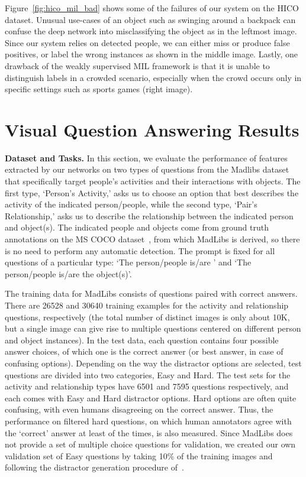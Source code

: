 \documentclass[runningheads]{llncs}
\begin{document}
Figure~\ref{fig:hico_mil_bad} shows some of the failures of our system on the HICO dataset. Unusual use-cases of an object such as swinging around a backpack can confuse the deep network into misclassifying the object as in the leftmost image. Since our system relies on detected people, we can either miss or produce false positives, or label the wrong instances as shown in the middle image. Lastly, one drawback of the weakly supervised MIL framework is that it is unable to distinguish labels in a crowded scenario, especially when the crowd occurs only in specific settings such as sports games (right image).

 


\section{Visual Question Answering Results}
\label{subsec:mcq}

{\bf Dataset and Tasks.} In this section, we evaluate the performance of features extracted by our networks on two types of questions from the Madlibs dataset~\cite{yu2015visual} that specifically target people's activities and their interactions with objects. The first type, `Person's Activity,' asks us to choose an option that best describes the activity of the indicated person/people, while the second type, `Pair's Relationship,' asks us to describe the relationship between the indicated person and object(s). The indicated people and objects come from ground truth annotations on the MS COCO dataset~\cite{lin2014microsoft}, from which MadLibs is derived, so there is no need to perform any automatic detection. The prompt is fixed for all questions of a particular type: `The person/people is/are \underline{}' and `The person/people is/are \underline{} the object(s)'. 

The training data for MadLibs consists of questions paired with correct answers. 
There are 26528 and 30640 training examples for the activity and relationship questions, respectively (the total number of distinct images is only about 10K, but a single image can give rise to multiple questions centered on different person and object instances). In the test data, each question contains four possible answer choices, of which one is the correct answer (or best answer, in case of confusing options). Depending on the way the distractor options are selected, test questions are divided into two categories, Easy and Hard. The test sets for the activity and relationship types have 6501 and 7595 questions respectively, and each comes with Easy and Hard distractor options. Hard options are often quite confusing, with even humans disagreeing on the correct answer. Thus, the performance on filtered hard questions, on which human annotators agree with the `correct' answer at least  of the times, is also measured. Since MadLibs does not provide a set of multiple choice questions for validation, we created our own validation set of Easy questions by taking 10\% of the training images and following the distractor generation procedure of~\cite{yu2015visual}.
\end{document}
